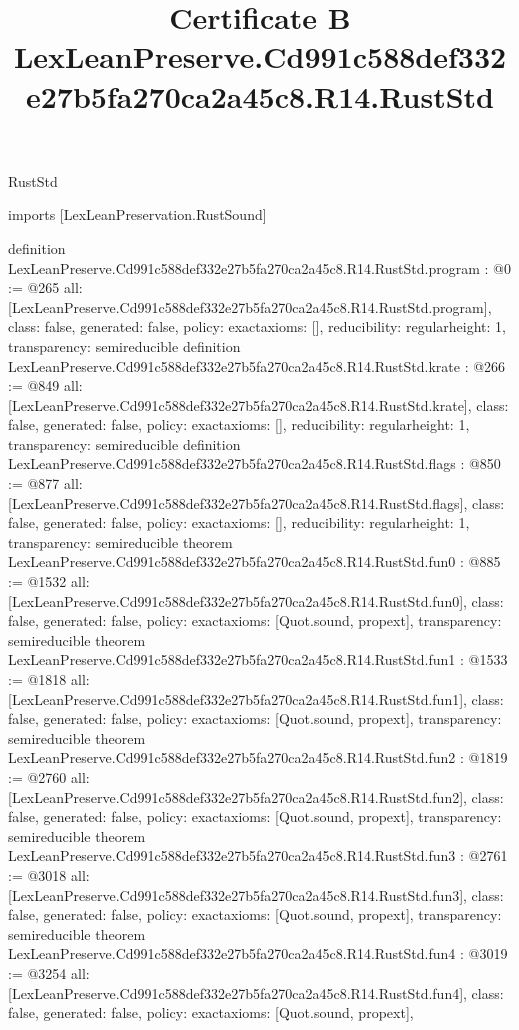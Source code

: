 \begin{lexlean}{RustStd}
\title{Certificate B LexLeanPreserve.Cd991c588def332e27b5fa270ca2a45c8.R14.RustStd}
\begin{coremodule}
imports [LexLeanPreservation.RustSound]

definition LexLeanPreserve.Cd991c588def332e27b5fa270ca2a45c8.R14.RustStd.program : @0 := @265 {
  all: [LexLeanPreserve.Cd991c588def332e27b5fa270ca2a45c8.R14.RustStd.program],
  class: false,
  generated: false,
  policy: exact{axioms: []},
  reducibility: regular{height: 1},
  transparency: semireducible
}
definition LexLeanPreserve.Cd991c588def332e27b5fa270ca2a45c8.R14.RustStd.krate : @266 := @849 {
  all: [LexLeanPreserve.Cd991c588def332e27b5fa270ca2a45c8.R14.RustStd.krate],
  class: false,
  generated: false,
  policy: exact{axioms: []},
  reducibility: regular{height: 1},
  transparency: semireducible
}
definition LexLeanPreserve.Cd991c588def332e27b5fa270ca2a45c8.R14.RustStd.flags : @850 := @877 {
  all: [LexLeanPreserve.Cd991c588def332e27b5fa270ca2a45c8.R14.RustStd.flags],
  class: false,
  generated: false,
  policy: exact{axioms: []},
  reducibility: regular{height: 1},
  transparency: semireducible
}
theorem LexLeanPreserve.Cd991c588def332e27b5fa270ca2a45c8.R14.RustStd.fun0 : @885 := @1532 {
  all: [LexLeanPreserve.Cd991c588def332e27b5fa270ca2a45c8.R14.RustStd.fun0],
  class: false,
  generated: false,
  policy: exact{axioms: [Quot.sound, propext]},
  transparency: semireducible
}
theorem LexLeanPreserve.Cd991c588def332e27b5fa270ca2a45c8.R14.RustStd.fun1 : @1533 := @1818 {
  all: [LexLeanPreserve.Cd991c588def332e27b5fa270ca2a45c8.R14.RustStd.fun1],
  class: false,
  generated: false,
  policy: exact{axioms: [Quot.sound, propext]},
  transparency: semireducible
}
theorem LexLeanPreserve.Cd991c588def332e27b5fa270ca2a45c8.R14.RustStd.fun2 : @1819 := @2760 {
  all: [LexLeanPreserve.Cd991c588def332e27b5fa270ca2a45c8.R14.RustStd.fun2],
  class: false,
  generated: false,
  policy: exact{axioms: [Quot.sound, propext]},
  transparency: semireducible
}
theorem LexLeanPreserve.Cd991c588def332e27b5fa270ca2a45c8.R14.RustStd.fun3 : @2761 := @3018 {
  all: [LexLeanPreserve.Cd991c588def332e27b5fa270ca2a45c8.R14.RustStd.fun3],
  class: false,
  generated: false,
  policy: exact{axioms: [Quot.sound, propext]},
  transparency: semireducible
}
theorem LexLeanPreserve.Cd991c588def332e27b5fa270ca2a45c8.R14.RustStd.fun4 : @3019 := @3254 {
  all: [LexLeanPreserve.Cd991c588def332e27b5fa270ca2a45c8.R14.RustStd.fun4],
  class: false,
  generated: false,
  policy: exact{axioms: [Quot.sound, propext]},
}
\end{coremodule}
\end{lexlean}
